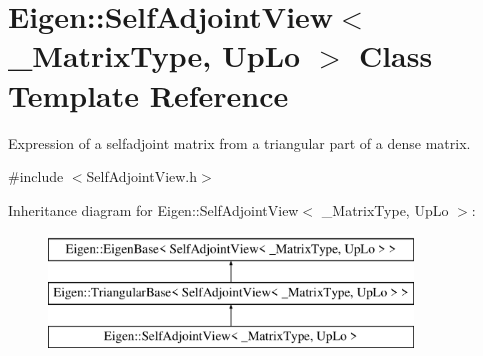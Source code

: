 \hypertarget{class_eigen_1_1_self_adjoint_view}{}\section{Eigen\+::Self\+Adjoint\+View$<$ \+\_\+\+Matrix\+Type, Up\+Lo $>$ Class Template Reference}
\label{class_eigen_1_1_self_adjoint_view}


Expression of a selfadjoint matrix from a triangular part of a dense matrix.  




{\ttfamily \#include $<$Self\+Adjoint\+View.\+h$>$}

Inheritance diagram for Eigen\+::Self\+Adjoint\+View$<$ \+\_\+\+Matrix\+Type, Up\+Lo $>$\+:\begin{figure}[H]
\begin{center}
\leavevmode
\includegraphics[height=3.000000cm]{class_eigen_1_1_self_adjoint_view}
\end{center}
\end{figure}

